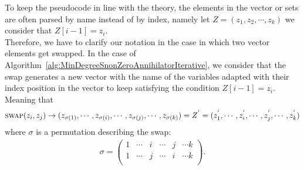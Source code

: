 \documentclass[11pt]{llncs}
\begin{document}
\begin{remark}\label{rem:permutationClarification}
    To keep the pseudocode in line with the theory, the elements in the vector or sets are often parsed by name instead of by index, namely let $Z = (z_1, z_2, \cdots, z_k)$ we consider that $Z[i-1] = z_i$.\\
    Therefore, we have to clarify our notation in the case in which two vector elements get swapped. In the case of Algorithm~\ref{alg:MinDegreeSnonZeroAnnihilatorIterative}, we consider that the swap generates a new vector with the name of the variables adapted with their index position in the vector to keep satisfying the condition $Z[i-1] = z_{i}$. Meaning that 
    \begin{align*}
        \mbox{\textsc{swap}}(z_i, z_j) \rightarrow (z_{\sigma(1)}, \cdots, z_{\sigma(i)}, \cdots, z_{\sigma(j)}, \cdots, z_{\sigma(k)}) = Z^{'} = (z^{'}_1, \cdots, z^{'}_i, \cdots, z^{'}_j, \cdots, z^{'}_k)
    \end{align*}
    where $\sigma$ is a permutation describing the swap:
    \begin{align*}
        \sigma = \begin{pmatrix}
            1 & \cdots & i & \cdots & j & \cdots k\\
            1 & \cdots & j & \cdots & i & \cdots k\\
        \end{pmatrix}.
    \end{align*}
\end{remark}

\end{document}
